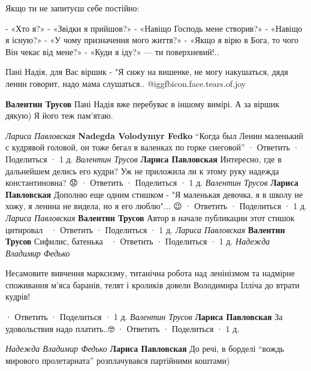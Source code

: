 \begin{itemize}
Якщо ти не запитуєш себе постійно:

\obeycr
- «Хто я?»
- «Звідки я прийшов?»
- «Навіщо Господь мене створив?»
- «Навіщо я існую?»
- «У чому призначення мого життя?»
- «Якщо я вірю в Бога, то чого Він чекає від мене?»
- «Куди я іду?» — ти поверхневий!..
\restorecr


Пані Надія, для Вас віршик - "Я сижу на вишенке, не могу накушаться, дядя ленин
говорит, надо мама слушаться.. @igg{fbicon.face.tears.of.joy} 

\begin{itemize} %
\textbf{Валентин Трусов} Пані Надія вже перебуває в іншому вимірі. А за віршик дякую) Я його теж пам'ятаю.

\begin{itemize} %
\emph{Лариса Павловская}
\textbf{Nadegda Volodymyr Fedko} \enquote{Когда был Ленин маленький с кудрявой головой, он тоже бегал в валенках по горке снеговой}
 · Ответить · Поделиться · 1 д.
\emph{Валентин Трусов}
\textbf{Лариса Павловская} Интересно, где в дальнейшем делись его кудри? Уж не приложила ли к этому руку надежда константиновна? 😟
 · Ответить · Поделиться · 1 д.
\emph{Валентин Трусов}
\textbf{Лариса Павловская} Дополню еще одним стишком - "Я маленькая девочка, я в школу не хожу, я ленина не видела, но я его люблю"... 😉
 · Ответить · Поделиться · 1 д.
\emph{Лариса Павловская}
\textbf{Валентин Трусов} Автор в начале публикации этот стишок цитировал 🙂
 · Ответить · Поделиться · 1 д.
\emph{Лариса Павловская}
\textbf{Валентин Трусов} Сифилис, батенька 🙂
 · Ответить · Поделиться · 1 д.
\emph{Надежда Владимир Федько}

Несамовите вивчення марксизму, титанічна робота над ленінізмом та надмірне
споживання м'яса баранів, телят і кроликів довели Володимира Ілліча до втрати
кудрів!

 · Ответить · Поделиться · 1 д.
\emph{Валентин Трусов}
\textbf{Лариса Павловская} За удовольствия надо платить..🤓
 · Ответить · Поделиться · 1 д.

\emph{Надежда Владимир Федько}
\textbf{Лариса Павловская} До речі, в борделі \enquote{вождь мирового пролетариата} розплачувався партійними коштами)
\end{itemize} %

\end{itemize} %

\end{itemize} %
